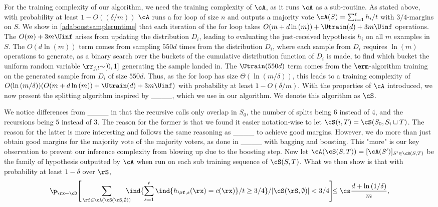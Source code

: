 For the training complexity of our algorithm, we need the training complexity of $\cA$, as it runs $ \cA $ as a sub-routine. As stated above, with probability at least $1-O((\delta/m))$ $ \cA $ runs a for loop of size $ n $ and outputs a majority vote $\cA(S)= \sum_{i=1}^{t} h_i/t $ with $ 3/4 $-margins on $ S.$ We show in \cref{adaboostsampleruntime} that each iteration of the for loop takes $ O(m+d\ln{\left(m \right)})+\Utrain(d)+3m\Uinf $ operations. The $ O(m)+3m\Uinf$ arises from updating the distribution $ D_{i} $, leading to evaluating the just-received hypothesis $ h_i $  on all $ m $ examples in $ S.$ The $O(d\ln{\left(m \right)} ) $ term comes from sampling $ 550d $ times from the distribution $D_{i}$, where each sample from $ D_{i} $  requires $ \ln{\left(m \right)} $ operations to generate, as a binary search over the buckets of the cumulative distribution function of $ D_{i} $ is made, to find which bucket the uniform random variable $ \rr_{j,l} {\sim} [0,1]$ generating the sample landed in. The $ \Utrain(550d) $ term comes from the $ \erm $-algorithm training on the generated sample from $ D_{i} $ of size $ 550d $. Thus, as the for loop has size $\Theta(\ln{\left(m/\delta \right)} ) $,  this leads to a training complexity of $ O(\ln{\left(m/\delta \right)} )(O(m+d\ln{\left(m \right)})+\Utrain(d)+3m\Uinf ) $ with probability at least $ 1-O(\delta/m)$. With the properties of $ \cA $ introduced, we now present the splitting algorithm inspired by ____, which we use in our algorithm. We denote this algorithm as $ \cS $.

We notice differences from ____ in that the recursive calls only overlap in $ S_{0} $, the number of splits being $ 6 $ instead of $ 4 $,  and the recursions being $ 5 $ instead of $ 3 $. The reason for the former is that we found it easier notation-wise to let $ \cS(i,T)=\cS(S_{0},S_{i}\sqcup T) $. The reason for the latter is more interesting and follows the same reasoning as ____ to achieve good margins. However, we do more than just obtain good margins for the majority vote of the majority voters, as done in ____ with bagging and boosting. This "more" is our key observation to prevent our inference complexity from blowing up due to the boosting step. Now let $ \cA(\cS(S,T)) =[\cA(S')]_{S'\in \cS(S,T)} $ be the family of hypothesis outputted by $ \cA $ when run on each sub training sequence of $ \cS(S,T) $. What we then show is that with probability at least $ 1-\delta $ over $ \rS $,          
\begin{align}\label{eq:deterministic error}
  \vspace{-0.4cm}
    \p_{\rx\sim\cD} \Bigg[  
      \sum_{\rf\in \cA(\cS(\rS,\emptyset))} \negmedspace \negmedspace \negmedspace \negmedspace \ind\{\sum_{s=1}^{t}  \ind\{h_{\rf,s}(\rx)=c(\rx)\}/t\geq 3/4\}/|\cS(\rS,\emptyset)|
       <3/4\Bigg]\negmedspace \negmedspace \leq \cs \frac{d+\ln{\left(1/\delta \right)}}{m},
  \end{align}
